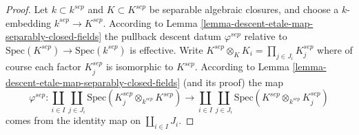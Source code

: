 \begin{proof}
Let $k \subset k^{sep}$ and $K \subset K^{sep}$ be
separable algebraic closures, and choose a $k$-embedding
$k^{sep} \to K^{sep}$. According to
Lemma \ref{lemma-descent-etale-map-separably-closed-fields}
the pullback descent datum $\varphi^{sep}$ relative to
$\text{Spec}(K^{sep}) \to \text{Spec}(k^{sep})$ is effective.
Write $K^{sep} \otimes_K K_i = \prod_{j \in J_i} K^{sep}_j$
where of course each factor $K^{sep}_j$ is isomorphic to $K^{sep}$.
According to Lemma \ref{lemma-descent-etale-map-separably-closed-fields}
(and its proof) the map
$$
\varphi^{sep} : 
\coprod_{i \in I} \coprod_{j \in J_i}
\text{Spec}(K^{sep}_j \otimes_{k^{sep}} K^{sep})
\longrightarrow
\coprod_{i \in I} \coprod_{j \in J_i}
\text{Spec}(K^{sep} \otimes_{k^{sep}} K^{sep}_j)
$$
comes from the identity map on $\coprod_{i \in I} J_i$.




\end{proof}


























